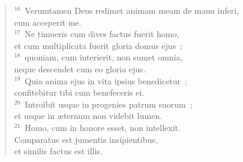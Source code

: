 \begin{flushleft}
\begin{verse}
${}^{16}$~Verumtamen Deus redimet animam meam de manu inferi,\\ cum acceperit me.\\
${}^{17}$~Ne timueris cum dives factus fuerit homo,\\ et cum multiplicata fuerit gloria domus ejus~:\\
${}^{18}$~quoniam, cum interierit, non sumet omnia,\\ neque descendet cum eo gloria ejus.\\
${}^{19}$~Quia anima ejus in vita ipsius benedicetur~;\\ confitebitur tibi cum benefeceris ei.\\
${}^{20}$~Introibit usque in progenies patrum suorum~;\\ et usque in \ae ternum non videbit lumen.\\
${}^{21}$~Homo, cum in honore esset, non intellexit.\\ Comparatus est jumentis insipientibus,\\ et similis factus est illis.\end{verse}\end{flushleft}




